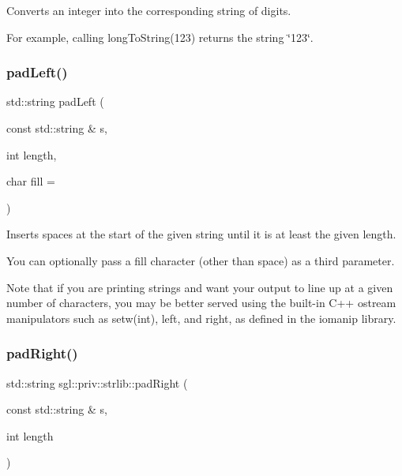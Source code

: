 Converts an integer into the corresponding string of digits. 

For example, calling {\ttfamily long\+To\+String(123)} returns the string {\ttfamily \char`\"{}123\char`\"{}}. \mbox{\label{namespacesgl_1_1priv_1_1strlib_a0348f17da6a9403cb06a7464b562da44}} 
\subsubsection{\texorpdfstring{pad\+Left()}{padLeft()}}
{\footnotesize\ttfamily std\+::string pad\+Left (\begin{DoxyParamCaption}\item[{const std\+::string \&}]{s,  }\item[{int}]{length,  }\item[{char}]{fill = {\ttfamily \textquotesingle{}~\textquotesingle{}} }\end{DoxyParamCaption})}



Inserts spaces at the start of the given string until it is at least the given length. 

You can optionally pass a fill character (other than space) as a third parameter.

Note that if you are printing strings and want your output to line up at a given number of characters, you may be better served using the built-\/in C++ ostream manipulators such as setw(int), left, and right, as defined in the iomanip library. \mbox{\label{namespacesgl_1_1priv_1_1strlib_a00d3d8b86782caf6b4d4386ef8c020ce}} 
\subsubsection{\texorpdfstring{pad\+Right()}{padRight()}\hspace{0.1cm}{\footnotesize\ttfamily [1/2]}}
{\footnotesize\ttfamily std\+::string sgl\+::priv\+::strlib\+::pad\+Right (\begin{DoxyParamCaption}\item[{const std\+::string \&}]{s,  }\item[{int}]{length }\end{DoxyParamCaption})}



